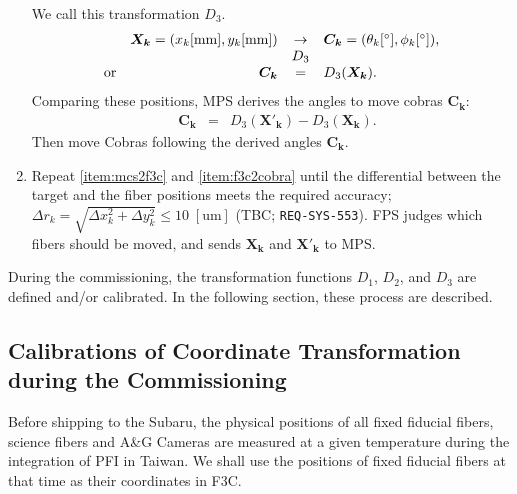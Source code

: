 \begin{enumerate}
We call this transformation $D_3$.
\begin{equation}
\begin{array}{crcl}
& \bm{X_k}=(x_k [ \mathrm{mm} ], y_k [ \mathrm{mm} ]) & \rightarrow & \bm{C_k}=(\theta _k [ ^\circ ], \phi _k [ ^\circ ]) ,\\
& & D_3 & \\
\mathrm{or} & \bm{C_k} & = & D_3(\bm{X_k}).
\end{array}
\end{equation}
Comparing these positions, MPS derives the angles to move cobras $\bm{C_k}$:
\begin{equation}
\begin{array}{crcl}
 & \bm{C_k} & = & D_3(\bm{X'_k}) - D_3(\bm{X_k}).
\end{array}
\end{equation}
Then move Cobras following the derived angles $\bm{C_k}$.
\item Repeat \ref{item:mcs2f3c} and \ref{item:f3c2cobra} until the differential between the target and the fiber positions meets the required accuracy; $\Delta r_k= \sqrt{ \Delta x_k^2 + \Delta y_k^2} \leq 10 \;\mathrm{[um]}$ (TBC; {\tt REQ-SYS-553}).
FPS judges which fibers should be moved, and sends $\bm{X_k}$ and $\bm{X'_k}$ to MPS.
\end{enumerate} 

During the commissioning, the transformation functions $D_1$, $D_2$, and $D_3$ are defined and/or calibrated.
In the following section, these process are described.

\subsection{Calibrations of Coordinate Transformation during the Commissioning}\label{sec:coord_calib}

Before shipping to the Subaru, the physical positions of all fixed fiducial fibers, science fibers and A\&G Cameras are measured at a given temperature during the integration of PFI in Taiwan.
We shall use the positions of fixed fiducial fibers at that time as their coordinates in F3C.

